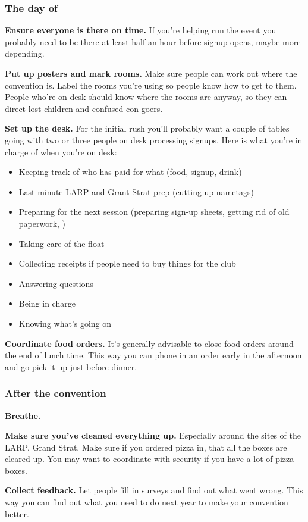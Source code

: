 \subsubsection{The day of}

\textbf{Ensure everyone is there on time.} If you're helping run the event you probably need to be there at least half an hour before signup opens, maybe more depending.

\textbf{Put up posters and mark rooms.} Make sure people can work out where the convention is. Label the rooms you're using so people know how to get to them. People who're on desk should know where the rooms are anyway, so they can direct lost children and confused con-goers.

\textbf{Set up the desk.} For the initial rush you'll probably want a couple of tables going with two or three people on desk processing signups. Here is what you're in charge of when you're on desk:

\begin{itemize}
  \item Keeping track of who has paid for what (food, signup, drink)
  \item Last-minute LARP and Grant Strat prep (\eg cutting up nametags)
  \item Preparing for the next session (preparing sign-up sheets, getting rid of old paperwork, \etc)
  \item Taking care of the float
  \item Collecting receipts if people need to buy things for the club
  \item Answering questions
  \item Being in charge
  \item Knowing what's going on
\end{itemize}

\textbf{Coordinate food orders.} It's generally advisable to close food orders around the end of lunch time. This way you can phone in an order early in the afternoon and go pick it up just before dinner.

\subsubsection{After the convention}

\textbf{Breathe.}

\textbf{Make sure you've cleaned everything up.} Especially around the sites of the LARP, Grand Strat. Make sure if you ordered pizza in, that all the boxes are cleared up. You may want to coordinate with security if you have a lot of pizza boxes.

\textbf{Collect feedback.} Let people fill in surveys and find out what went wrong. This way you can find out what you need to do next year to make your convention better.